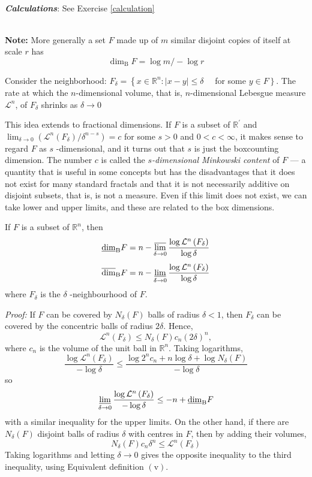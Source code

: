 \textbf{\textit{\\Calculations}}: See Exercise \ref{calculation}

\textbf{\\Note: }More generally a set $F$ made up of $m$ similar disjoint copies of itself at scale $r$ has $$\operatorname{dim}_{\mathrm{B}} F=\log m /-\log r$$

Consider the neighborhood: $F_{\delta}=\left\{x \in \mathbb{R}^{n}:|x-y| \leq \delta \quad\right.$ for some $\left.y \in F\right\}$. The rate at which the $n$-dimensional volume, that is, $n$-dimensional Lebesgue measure $\mathcal{L}^n$, of $F_\delta$ shrinks as $\delta\rightarrow 0$

This idea extends to fractional dimensions. If $F$ is a subset of $\mathbb{R}^{\prime}$ and $\displaystyle\lim _{\delta \rightarrow 0}\left(\mathcal{L}^{n}\left(F_{\delta}\right) / \delta^{n-s}\right)=c$ for some $s>0$ and $0<c<\infty$, it makes sense to
regard $F$ as $s$ -dimensional, and it turns out that $s$ is just the boxcounting dimension. The number $c$ is called the \textit{$s$-dimensional Minkowski content} of $F$ --- a quantity that is useful in some concepts but has the disadvantages that it does not exist for many standard fractals and that it is not necessarily additive on disjoint subsets, that is, is not a measure. Even if this limit does not exist, we can take lower and upper limits, and these are related to the box dimensions.


\begin{proposition}
    If $F$ is a subset of $\mathbb{R}^{n}$, then
$$
\underline{\operatorname{dim}}_{\mathrm{B}} F=n-\varlimsup_{\delta \rightarrow 0} \frac{\log \mathcal{L}^{n}\left(F_{\delta}\right)}{\log \delta}
$$
$$
\overline{\operatorname{dim}}_{\mathrm{B}} F=n-\operatorname*{\underline{lim}}_{\delta \rightarrow 0} \frac{\log \mathcal{L}^{n}\left(F_{\delta}\right)}{\log \delta}
$$
where $F_{\delta}$ is the $\delta$ -neighbourhood of $F$. 
\end{proposition}
\textit{Proof: }
If $F$ can be covered by $N_{\delta}(F)$ balls of radius $\delta<1$, then $F_{\delta}$ can be covered by the concentric balls of radius $2 \delta .$ Hence,
$$
\mathcal{L}^{n}\left(F_{\delta}\right) \leq N_{\delta}(F) c_{n}(2 \delta)^{n},
$$
where $c_{n}$ is the volume of the unit ball in $\mathbb{R}^{n} .$ Taking logarithms,
$$
\frac{\log \mathcal{L}^{n}\left(F_{\delta}\right)}{-\log \delta} \leq \frac{\log 2^{n} c_{n}+n \log \delta+\log N_{\delta}(F)}{-\log \delta}
$$
so
$$
\varliminf_{\delta \rightarrow 0} \frac{\log \mathcal{L}^{n}\left(F_{\delta}\right)}{-\log \delta} \leq -n+\underline{\operatorname{dim}}_{\mathrm{B}} F
$$
with a similar inequality for the upper limits. On the other hand, if there are $N_{\delta}(F)$ disjoint balls of radius $\delta$ with centres in $F$, then by adding their volumes,
$$
N_{\delta}(F) c_{n} \delta^{n} \leq \mathcal{L}^{n}\left(F_{\delta}\right)
$$
Taking logarithms and letting $\delta \rightarrow 0$ gives the opposite inequality to the third inequality, using Equivalent definition $(\mathrm{v})$.


